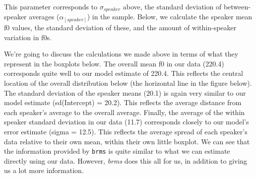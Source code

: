 \documentclass[
]{book}
\newenvironment{Shaded}{\begin{snugshade}}{\end{snugshade}}
\newcommand{\AttributeTok}[1]{\textcolor[rgb]{0.77,0.63,0.00}{#1}}
\newcommand{\CommentTok}[1]{\textcolor[rgb]{0.56,0.35,0.01}{\textit{#1}}}
\newcommand{\DocumentationTok}[1]{\textcolor[rgb]{0.56,0.35,0.01}{\textbf{\textit{#1}}}}
\newcommand{\FunctionTok}[1]{\textcolor[rgb]{0.00,0.00,0.00}{#1}}
\newcommand{\NormalTok}[1]{#1}
\newcommand{\OtherTok}[1]{\textcolor[rgb]{0.56,0.35,0.01}{#1}}
\newcommand{\SpecialCharTok}[1]{\textcolor[rgb]{0.00,0.00,0.00}{#1}}
\begin{document}
This parameter corresponds to \(\sigma_{speaker}\) above, the standard deviation of between-speaker averages (\(\alpha_{[speaker]}\)) in the sample. Below, we calculate the speaker mean f0 values, the standard deviation of these, and the amount of within-speaker variation in f0s.

\begin{Shaded}
\end{Shaded}

We're going to discuss the calculations we made above in terms of what they represent in the boxplots below. The overall mean f0 in our data (220.4) corresponds quite well to our model estimate of 220.4. This reflects the central location of the overall distribution below (the horizontal line in the figure below). The standard deviation of the speaker means (20.1) is again very similar to our model estimate (sd(Intercept) = 20.2). This reflects the average distance from each speaker's average to the overall average. Finally, the average of the within speaker standard deviation in our data (11.7) corresponds closely to our model's error estimate (sigma = 12.5). This reflects the average spread of each speaker's data relative to their own mean, within their own little boxplot. We can see that the information provided by \texttt{brms} is quite similar to what we can estimate directly using our data. However, \emph{brms} does this all for us, in addition to giving us a lot more information.
\end{document}
